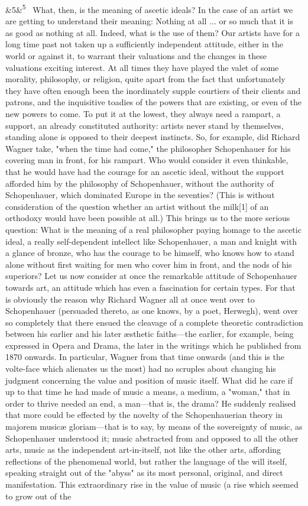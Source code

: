 \documentclass[12pt]{article}
\newcommand{\para}[1][]{\par\noindent\ifx&#1&\else\textsuperscript{\footnotesize #1}~\fi}
\begin{document}
\para[5] What, then, is the meaning of ascetic ideals? In the case of an artist we are getting to understand their meaning: Nothing at all ... or so much that it is as good as nothing at all. Indeed, what is the use of them? Our artists have for a long time past not taken up a sufficiently independent attitude, either in the world or against it, to warrant their valuations and the changes in these valuations exciting interest. At all times they have played the valet of some morality, philosophy, or religion, quite apart from the fact that unfortunately they have often enough been the inordinately supple courtiers of their clients and patrons, and the inquisitive toadies of the powers that are existing, or even of the new powers to come. To put it at the lowest, they always need a rampart, a support, an already constituted authority: artists never stand by themselves, standing alone is opposed to their deepest instincts. So, for example, did Richard Wagner take, "when the time had come," the philosopher Schopenhauer for his covering man in front, for his rampart. Who would consider it even thinkable, that he would have had the courage for an ascetic ideal, without the support afforded him by the philosophy of Schopenhauer, without the authority of Schopenhauer, which dominated Europe in the seventies? (This is without consideration of the question whether an artist without the milk[1] of an orthodoxy would have been possible at all.) This brings us to the more serious question: What is the meaning of a real philosopher paying homage to the ascetic ideal, a really self-dependent intellect like Schopenhauer, a man and knight with a glance of bronze, who has the courage to be himself, who knows how to stand alone without first waiting for men who cover him in front, and the nods of his superiors? Let us now consider at once the remarkable attitude of Schopenhauer towards art, an attitude which has even a fascination for certain types. For that is obviously the reason why Richard Wagner all at once went over to Schopenhauer (persuaded thereto, as one knows, by a poet, Herwegh), went over so completely that there ensued the cleavage of a complete theoretic contradiction between his earlier and his later æsthetic faiths---the earlier, for example, being expressed in Opera and Drama, the later in the writings which he published from 1870 onwards. In particular, Wagner from that time onwards (and this is the volte-face which alienates us the most) had no scruples about changing his judgment concerning the value and position of music itself. What did he care if up to that time he had made of music a means, a medium, a "woman," that in order to thrive needed an end, a man---that is, the drama? He suddenly realised that more could be effected by the novelty of the Schopenhauerian theory in majorem musicæ gloriam---that is to say, by means of the sovereignty of music, as Schopenhauer understood it; music abstracted from and opposed to all the other arts, music as the independent art-in-itself, not like the other arts, affording reflections of the phenomenal world, but rather the language of the will itself, speaking straight out of the "abyss" as its most personal, original, and direct manifestation. This extraordinary rise in the value of music (a rise which seemed to grow out of the 
\end{document}
